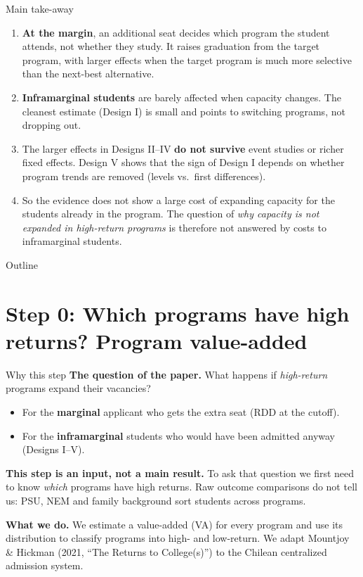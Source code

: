 \documentclass{beamer}
\begin{document}
\begin{frame}{Main take-away}
\normalsize
\begin{enumerate}
    \setlength{\itemsep}{8pt}
    \item \textbf{At the margin}, an additional seat decides which program the student attends, not whether they study.
    It raises graduation from the target program, with larger effects when the target program is much more selective than the next-best alternative.
    \item \textbf{Inframarginal students} are barely affected when capacity changes. The cleanest estimate (Design I) is small
    and points to switching programs, not dropping out.
    \item The larger effects in Designs II--IV \textbf{do not survive} event studies or richer fixed effects. Design V shows that the sign of Design I depends on whether program trends are removed (levels vs.\ first differences).
    \item So the evidence does not show a large cost of expanding capacity for the students already in the program.
    The question of \emph{why capacity is not expanded in high-return programs} is therefore not answered by costs to inframarginal students.
\end{enumerate}
\end{frame}

\begin{frame}{Outline}
\tableofcontents
\end{frame}

\section{Step 0: Which programs have high returns? Program value-added}

\begin{frame}[label=va-why]{Why this step}
\small
\textbf{The question of the paper.} What happens if \emph{high-return} programs expand their vacancies?
\begin{itemize}
    \setlength{\itemsep}{4pt}
    \item For the \textbf{marginal} applicant who gets the extra seat (RDD at the cutoff).
    \item For the \textbf{inframarginal} students who would have been admitted anyway (Designs I--V).
\end{itemize}

\vspace{0.2cm}
\textbf{This step is an input, not a main result.} To ask that question we first need to know \emph{which} programs have high returns.
Raw outcome comparisons do not tell us: PSU, NEM and family background sort students across programs.

\vspace{0.2cm}
\textbf{What we do.} We estimate a value-added (VA) for every program and use its distribution to classify programs into high- and low-return.
We adapt Mountjoy \& Hickman (2021, ``The Returns to College(s)'') to the Chilean centralized admission system.
\end{frame}
\end{document}
